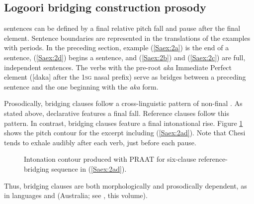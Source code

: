 \documentclass[output=paper]{LSP/langsci}
\begin{document}
\subsection{Logoori bridging construction prosody}
\label{Saprosody}
  sentences can be defined by a final relative pitch fall and pause after the final element. Sentence boundaries are represented in the translations of the examples with periods. In the preceding section, example (\ref{Saex:2a}) is the end of a  sentence, (\ref{Saex:2d}) begins a  sentence, and (\ref{Saex:2b}) and (\ref{Saex:2c}) are full, independent  sentences. The verbs with the pre-root \textit{aka} Immediate Perfect element ([daka] after the \textsc{1sg} nasal prefix) serve as bridges between a preceding  sentence and the one beginning with the \textit{aka} form. 

Prosodically,  bridging clauses follow a cross-linguistic pattern of non-final  \citep{devries.2005}. As stated above,  declarative  features a final fall. Reference clauses follow this pattern. In contrast, bridging clauses feature a final intonational rise. Figure \ref{SaFig1} shows the pitch contour for the excerpt including (\ref{Saex:2ad}). Note that Chesi tends to exhale audibly after each verb, just before each pause.\nocite{PRAAT}


\begin{figure}[ht]
\caption{Intonation contour produced with PRAAT for six-clause reference-bridging sequence in (\ref{Saex:2ad}). \label{SaFig1}}
\end{figure}

Thus,  bridging clauses are both morphologically  and prosodically dependent, as in  languages and  (Australia; see , this volume).
\end{document}
